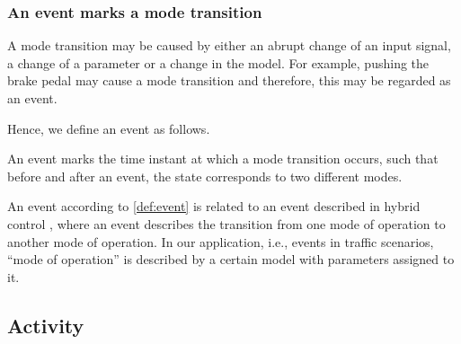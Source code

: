 \subsubsection{An event marks a mode transition}
A mode transition may be caused by either an abrupt change of an input signal, a change of a parameter or a change in the model. For example, pushing the brake pedal may cause a mode transition and therefore, this may be regarded as an event. 


Hence, we define an event as follows.
\begin{definition}[Event] \label{def:event}
	An event marks the time instant at which a mode transition occurs, such that before and after an event, the state corresponds to two different modes.
\end{definition}

An event according to \cref{def:event} is related to an event described in hybrid control \cite{deschutter2000optimal}, where an event describes the transition from one mode of operation to another mode of operation. In our application, i.e., events in traffic scenarios, ``mode of operation'' is described by a certain model with parameters assigned to it.



\cbstart
\subsection{Activity}
\label{sec:activity}


